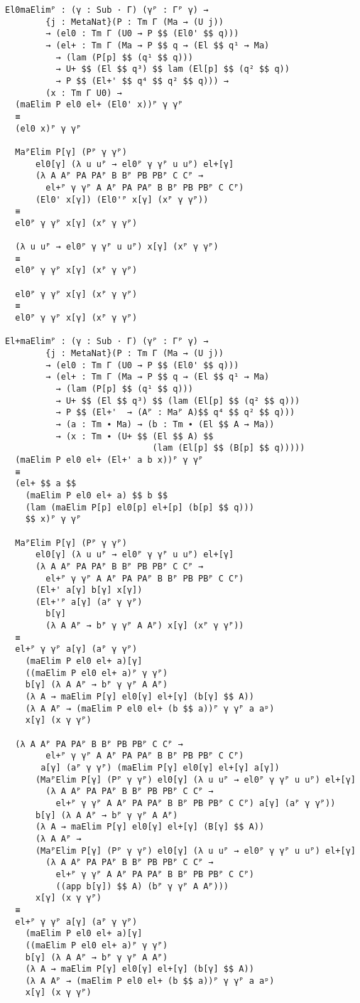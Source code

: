 \begin{verbatim}
El0maElimᴾ : (γ : Sub · Γ) (γᴾ : Γᴾ γ) →
        {j : MetaNat}(P : Tm Γ (Ma → (U j))
        → (el0 : Tm Γ (U0 → P $$ (El0' $$ q)))
        → (el+ : Tm Γ (Ma → P $$ q → (El $$ q¹ → Ma)
          → (lam (P[p] $$ (q¹ $$ q)))
          → U+ $$ (El $$ q³) $$ lam (El[p] $$ (q² $$ q))
          → P $$ (El+' $$ q⁴ $$ q² $$ q))) →
        (x : Tm Γ U0) →
  (maElim P el0 el+ (El0' x))ᴾ γ γᴾ
  ≡
  (el0 x)ᴾ γ γᴾ

  MaᴾElim P[γ] (Pᴾ γ γᴾ)
      el0[γ] (λ u uᴾ → el0ᴾ γ γᴾ u uᴾ) el+[γ]
      (λ A Aᴾ PA PAᴾ B Bᴾ PB PBᴾ C Cᴾ →
        el+ᴾ γ γᴾ A Aᴾ PA PAᴾ B Bᴾ PB PBᴾ C Cᴾ)
      (El0' x[γ]) (El0'ᴾ x[γ] (xᴾ γ γᴾ))
  ≡
  el0ᴾ γ γᴾ x[γ] (xᴾ γ γᴾ)

  (λ u uᴾ → el0ᴾ γ γᴾ u uᴾ) x[γ] (xᴾ γ γᴾ)
  ≡
  el0ᴾ γ γᴾ x[γ] (xᴾ γ γᴾ)

  el0ᴾ γ γᴾ x[γ] (xᴾ γ γᴾ)
  ≡
  el0ᴾ γ γᴾ x[γ] (xᴾ γ γᴾ)

El+maElimᴾ : (γ : Sub · Γ) (γᴾ : Γᴾ γ) →
        {j : MetaNat}(P : Tm Γ (Ma → (U j))
        → (el0 : Tm Γ (U0 → P $$ (El0' $$ q)))
        → (el+ : Tm Γ (Ma → P $$ q → (El $$ q¹ → Ma)
          → (lam (P[p] $$ (q¹ $$ q)))
          → U+ $$ (El $$ q³) $$ (lam (El[p] $$ (q² $$ q)))
          → P $$ (El+'  → (Aᴾ : Maᴾ A)$$ q⁴ $$ q² $$ q)))
          → (a : Tm ∙ Ma) → (b : Tm ∙ (El $$ A → Ma))
          → (x : Tm ∙ (U+ $$ (El $$ A) $$
                             (lam (El[p] $$ (B[p] $$ q)))))
  (maElim P el0 el+ (El+' a b x))ᴾ γ γᴾ
  ≡
  (el+ $$ a $$
    (maElim P el0 el+ a) $$ b $$
    (lam (maElim P[p] el0[p] el+[p] (b[p] $$ q)))
    $$ x)ᴾ γ γᴾ

  MaᴾElim P[γ] (Pᴾ γ γᴾ)
      el0[γ] (λ u uᴾ → el0ᴾ γ γᴾ u uᴾ) el+[γ]
      (λ A Aᴾ PA PAᴾ B Bᴾ PB PBᴾ C Cᴾ →
        el+ᴾ γ γᴾ A Aᴾ PA PAᴾ B Bᴾ PB PBᴾ C Cᴾ)
      (El+' a[γ] b[γ] x[γ])
      (El+'ᴾ a[γ] (aᴾ γ γᴾ)
        b[γ]
        (λ A Aᴾ → bᴾ γ γᴾ A Aᴾ) x[γ] (xᴾ γ γᴾ))
  ≡
  el+ᴾ γ γᴾ a[γ] (aᴾ γ γᴾ)
    (maElim P el0 el+ a)[γ]
    ((maElim P el0 el+ a)ᴾ γ γᴾ)
    b[γ] (λ A Aᴾ → bᴾ γ γᴾ A Aᴾ)
    (λ A → maElim P[γ] el0[γ] el+[γ] (b[γ] $$ A))
    (λ A Aᴾ → (maElim P el0 el+ (b $$ a))ᴾ γ γᴾ a aᵖ)
    x[γ] (x γ γᴾ)

  (λ A Aᴾ PA PAᴾ B Bᴾ PB PBᴾ C Cᴾ →
        el+ᴾ γ γᴾ A Aᴾ PA PAᴾ B Bᴾ PB PBᴾ C Cᴾ)
       a[γ] (aᴾ γ γᴾ) (maElim P[γ] el0[γ] el+[γ] a[γ])
      (MaᴾElim P[γ] (Pᴾ γ γᴾ) el0[γ] (λ u uᴾ → el0ᴾ γ γᴾ u uᴾ) el+[γ]
        (λ A Aᴾ PA PAᴾ B Bᴾ PB PBᴾ C Cᴾ →
          el+ᴾ γ γᴾ A Aᴾ PA PAᴾ B Bᴾ PB PBᴾ C Cᴾ) a[γ] (aᴾ γ γᴾ))
      b[γ] (λ A Aᴾ → bᴾ γ γᴾ A Aᴾ)
      (λ A → maElim P[γ] el0[γ] el+[γ] (B[γ] $$ A))
      (λ A Aᴾ →
      (MaᴾElim P[γ] (Pᴾ γ γᴾ) el0[γ] (λ u uᴾ → el0ᴾ γ γᴾ u uᴾ) el+[γ]
        (λ A Aᴾ PA PAᴾ B Bᴾ PB PBᴾ C Cᴾ →
          el+ᴾ γ γᴾ A Aᴾ PA PAᴾ B Bᴾ PB PBᴾ C Cᴾ)
          ((app b[γ]) $$ A) (bᴾ γ γᴾ A Aᴾ)))
      x[γ] (x γ γᴾ)
  ≡
  el+ᴾ γ γᴾ a[γ] (aᴾ γ γᴾ)
    (maElim P el0 el+ a)[γ]
    ((maElim P el0 el+ a)ᴾ γ γᴾ)
    b[γ] (λ A Aᴾ → bᴾ γ γᴾ A Aᴾ)
    (λ A → maElim P[γ] el0[γ] el+[γ] (b[γ] $$ A))
    (λ A Aᴾ → (maElim P el0 el+ (b $$ a))ᴾ γ γᴾ a aᵖ)
    x[γ] (x γ γᴾ)


\end{verbatim}
